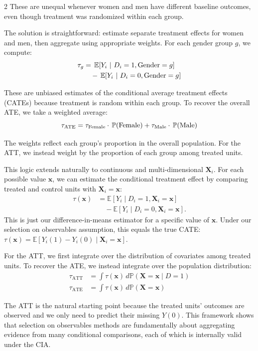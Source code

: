 \documentclass[12pt]{article}
\begin{document}
\begin{multicols}{2}
These are unequal whenever women and men have different baseline outcomes, even though treatment was randomized within each group.

The solution is straightforward: estimate separate treatment effects for women and men, then aggregate using appropriate weights.
For each gender group $g$, we compute:
\begin{align*}
  \tau_g 
  &= \expec{Y_i}{D_i = 1, \text{Gender} = g} \\
  &\quad - \expec{Y_i}{D_i = 0, \text{Gender} = g}
\end{align*}

These are unbiased estimates of the conditional average treatment effects (CATEs) because treatment is random within each group.
To recover the overall ATE, we take a weighted average:
$$\tau_{\text{ATE}} = \tau_{\text{Female}} \cdot \prob{\text{Female}} + \tau_{\text{Male}} \cdot \prob{\text{Male}}$$

The weights reflect each group's proportion in the overall population.
For the ATT, we instead weight by the proportion of each group among treated units.

This logic extends naturally to continuous and multi-dimensional $\bm{X}_i$.
For each possible value $\bm{x}$, we can estimate the conditional treatment effect by comparing treated and control units with $\bm{X}_i = \bm{x}$:
\begin{align*}
  \tau(\bm{x}) 
  &= \mathbb{E}[Y_i \mid D_i = 1, \bm{X}_i = \bm{x}] \\
  &\quad - \mathbb{E}[Y_i \mid D_i = 0, \bm{X}_i = \bm{x}].
\end{align*}
This is just our difference-in-means estimator for a specific value of $\bm{x}$.
Under our selection on observables assumption, this equals the true CATE: $\tau(\bm{x}) = \mathbb{E}[Y_i(1) - Y_i(0) \mid \bm{X}_i = \bm{x}]$.

For the ATT, we first integrate over the distribution of covariates among treated units. To recover the ATE, we instead integrate over the population distribution:
\begin{align*}
\tau_{\text{ATT}} &= \int \tau(\bm{x}) \, d\mathbb{P}(\bm{X} = \bm{x} \mid D = 1)
\\
\tau_{\text{ATE}} &= \int \tau(\bm{x}) \, d\mathbb{P}(\bm{X} = \bm{x})
\end{align*}

The ATT is the natural starting point because the treated units' outcomes are observed and we only need to predict their missing $Y(0)$.
This framework shows that selection on observables methods are fundamentally about aggregating evidence from many conditional comparisons, each of which is internally valid under the CIA.


\end{multicols}
\end{document}

